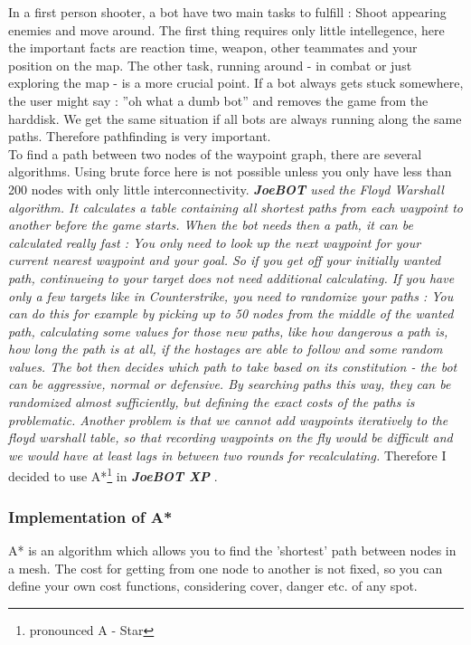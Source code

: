 \documentclass[12pt]{article}
\newcommand {\joebotxp}{\textit{\textbf{JoeBOT XP}} }
\newcommand {\joebot}{\textit{\textbf{JoeBOT}} }
\begin{document}
In a first person shooter, a bot have two main tasks to fulfill : Shoot appearing enemies and move around. The first thing requires only little intellegence, here the important facts are reaction time, weapon, other teammates and your position on the map. The other task, running around - in combat or just exploring the map - is a more crucial point. If a bot always gets stuck somewhere, the user might say : ''oh what a dumb bot'' and removes the game from the harddisk. We get the same situation if all bots are always running along the same paths. Therefore pathfinding is very important.\\
To find a path between two nodes of the waypoint graph, there are several algorithms. Using brute force here is not possible unless you only have less than 200 nodes with only little interconnectivity. \textit{\joebot used the Floyd Warshall algorithm. It calculates a table containing all shortest paths from each waypoint to another before the game starts. When the bot needs then a path, it can be calculated really fast : You only need to look up the next waypoint for your current nearest waypoint and your goal. So if you get off your initially wanted path, continueing to your target does not need additional calculating. If you have only a few targets like in Counterstrike, you need to randomize your paths : You can do this for example by picking up to 50 nodes from the middle of the wanted path, calculating some values for those new paths, like how dangerous a path is, how long the path is at all, if the hostages are able to follow and some random values. The bot then decides which path to take based on its constitution - the bot can be aggressive, normal or defensive. By searching paths this way, they can be randomized almost sufficiently, but defining the exact costs of the paths is problematic. Another problem is that we cannot add waypoints iteratively to the floyd warshall table, so that recording waypoints on the fly would be difficult and we would have at least lags in between two rounds for recalculating.} Therefore I decided to use A*\footnote{pronounced A - Star} in \joebotxp.

\subsubsection{Implementation of A*}

A* is an algorithm which allows you to find the 'shortest' path between nodes in a mesh. The cost for getting from one node to another is not fixed, so you can define your own cost functions, considering cover, danger etc. of any spot.
\end{document}
